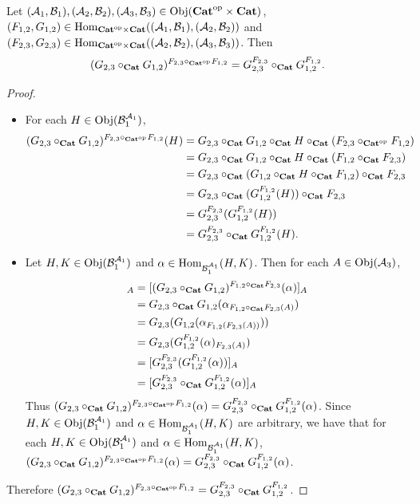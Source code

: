 \documentclass{book}
\begin{document}
	\begin{ex} 
		Let $(\MA_1, \MB_1), (\MA_2, \MB_2), (\MA_3, \MB_3) \in \Obj(\op{\bCat} \times \bCat)$, $(F_{1,2}, G_{1,2}) \in \Hom_{\op{\bCat} \times \bCat}((\MA_1, \MB_1), (\MA_2, \MB_2))$ and  $(F_{2,3}, G_{2,3}) \in \Hom_{\op{\bCat} \times \bCat}((\MA_2, \MB_2), (\MA_3, \MB_3))$. Then 
		$$(G_{2,3} \circ_{\bCat} G_{1,2})^{F_{2,3} \circ_{\op{\bCat}} F_{1,2}} = G_{2,3}^{F_{2,3}} \circ_{\bCat} G_{1,2}^{F_{1,2}}.$$
	\end{ex}
	
	\begin{proof}\
		\begin{itemize}
			\item For each $H \in \Obj(\MB_1^{\MA_1})$, 
			\begin{align*}
				(G_{2,3} \circ_{\bCat} G_{1,2})^{F_{2,3} \circ_{\op{\bCat}} F_{1,2}}(H)
				& = G_{2,3} \circ_{\bCat} G_{1,2} \circ_{\bCat} H \circ_{\bCat} (F_{2,3} \circ_{\op{\bCat}} F_{1,2}) \\
				& = G_{2,3} \circ_{\bCat} G_{1,2} \circ_{\bCat} H \circ_{\bCat} (F_{1,2} \circ_{\bCat} F_{2,3}) \\
				& = G_{2,3} \circ_{\bCat} (G_{1,2} \circ_{\bCat} H \circ_{\bCat} F_{1,2}) \circ_{\bCat} F_{2,3} \\
				& = G_{2,3} \circ_{\bCat} (G_{1,2}^{F_{1,2}}(H)) \circ_{\bCat} F_{2,3} \\
				& = G_{2,3}^{F_{2,3}} (G_{1,2}^{F_{1,2}}(H)) \\
				& = G_{2,3}^{F_{2,3}} \circ_{\bCat} G_{1,2}^{F_{1,2}}(H).
			\end{align*}
			\item Let $H,K \in \Obj(\MB_1^{\MA_1})$ and $\al \in \Hom_{\MB_1^{\MA_1}}(H, K)$. Then for each $A \in \Obj(\MA_3)$,
			\begin{align*}
				[(G_{2,3} \circ_{\bCat} G_{1,2})^{F_{2,3} \circ_{\op{\bCat}} F_{1,2}}(\al)]_A
				& = [(G_{2,3} \circ_{\bCat} G_{1,2})^{F_{1,2} \circ_{\bCat} F_{2,3}}(\al)]_A \\
				& = G_{2,3} \circ_{\bCat} G_{1,2}(\al_{F_{1,2} \circ_{\bCat} F_{2,3}(A)}) \\
				& = G_{2,3}(G_{1,2}(\al_{F_{1,2}(F_{2,3}(A))})) \\
				& = G_{2,3}(G_{1,2}^{F_{1,2}}(\al)_{F_{2,3}(A)}) \\
				& = [G_{2,3}^{F_{2,3}}(G_{1,2}^{F_{1,2}}(\al))]_A \\
				& = [G_{2,3}^{F_{2,3}} \circ_{\bCat} G_{1,2}^{F_{1,2}} (\al)]_A
			\end{align*}
			Thus $(G_{2,3} \circ_{\bCat} G_{1,2})^{F_{2,3} \circ_{\op{\bCat}} F_{1,2}}(\al) = G_{2,3}^{F_{2,3}} \circ_{\bCat} G_{1,2}^{F_{1,2}} (\al)$. Since $H,K \in \Obj(\MB_1^{\MA_1})$ and $\al \in \Hom_{\MB_1^{\MA_1}}(H, K)$ are arbitrary, we have that for each $H,K \in \Obj(\MB_1^{\MA_1})$ and $\al \in \Hom_{\MB_1^{\MA_1}}(H, K)$, $(G_{2,3} \circ_{\bCat} G_{1,2})^{F_{2,3} \circ_{\op{\bCat}} F_{1,2}}(\al) = G_{2,3}^{F_{2,3}} \circ_{\bCat} G_{1,2}^{F_{1,2}} (\al)$.
		\end{itemize}
		Therefore $(G_{2,3} \circ_{\bCat} G_{1,2})^{F_{2,3} \circ_{\op{\bCat}} F_{1,2}} = G_{2,3}^{F_{2,3}} \circ_{\bCat} G_{1,2}^{F_{1,2}}$.
	\end{proof}
	
\end{document}
